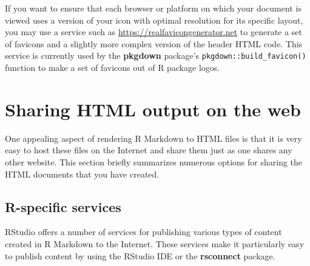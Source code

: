 \documentclass[
  11pt,
]{krantz}
\begin{document}
If you want to ensure that each browser or platform on which your document is viewed uses a version of your icon with optimal resolution for its specific layout, you may use a service such as \url{https://realfavicongenerator.net} to generate a set of favicons and a slightly more complex version of the header HTML code. This service is currently used by the \textbf{pkgdown} package's \texttt{pkgdown::build\_favicon()} function to make a set of favicons out of R package logos.

\hypertarget{html-share}{%
\section{Sharing HTML output on the web}\label{html-share}}

One appealing aspect of rendering R Markdown to HTML files is that it is very easy to host these files on the Internet and share them just as one shares any other website. This section briefly summarizes numerous options for sharing the HTML documents that you have created.

\hypertarget{r-specific-services}{%
\subsection{R-specific services}\label{r-specific-services}}

RStudio offers a number of services for publishing various types of content created in R Markdown to the Internet. These services make it particularly easy to publish content by using the RStudio IDE or the \textbf{rsconnect} package.
\end{document}
